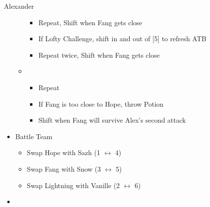 \begin{multicols}{2}
\begin{battle}{Alexander}
\begin{itemize}
\begin{itemize}
\begin{itemize}
            \item Repeat, Shift when Fang gets close
            \item If Lofty Challenge, shift in and out of [5] to refresh ATB
            \item Repeat twice, Shift when Fang gets close
        \end{itemize}
        \item \first
        \begin{itemize}
            \item Repeat
            \item If Fang is too close to Hope, throw Potion
            \item Shift when Fang will survive Alex's second attack
        \end{itemize}
    \end{itemize}
\end{itemize}
\end{battle}

\begin{menu}
\begin{itemize}
    \paradigm
    \begin{itemize}
        \item Battle Team
        \begin{itemize}
            \item Swap Hope with Sazh (1 $\leftrightarrow$ 4)
            \item Swap Fang with Snow (3 $\leftrightarrow$ 5)
            \item Swap Lightning with Vanille (2 $\leftrightarrow$ 6)
        \end{itemize}
        \item {}%
{\paradigmline{\com}{\med}{(\com)}}%
{\paradigmline{\com}{(\sab)}{\rav}}%
{\paradigmline{\syn}{\med}{(\com)}}%
{\paradigmline{[\com]}{(\sab)}{\com}}%
{\paradigmline[5]{\textit{\syn}}{\textit{[\sab]}}{\textit{\com}}}%
{\paradigmline{[\com]}{\rav}{\com}}
    \end{itemize}
\end{itemize}
\end{menu}

\renewcommand{\first}{[1] Tireless Charge (\com/\med/\com)}
\renewcommand{\second}{[2] Ruthless (\com/\sab/\rav)}
\renewcommand{\third}{[3] }
\renewcommand{\fourth}{[4] Devastation (\com/\sab/\com}
\renewcommand{\fifth}{[5] Bully (\syn/\sab/\rav)}
\renewcommand{\sixth}{[6] Relentless Assault (\com/\rav/\com)}


\end{multicols}
